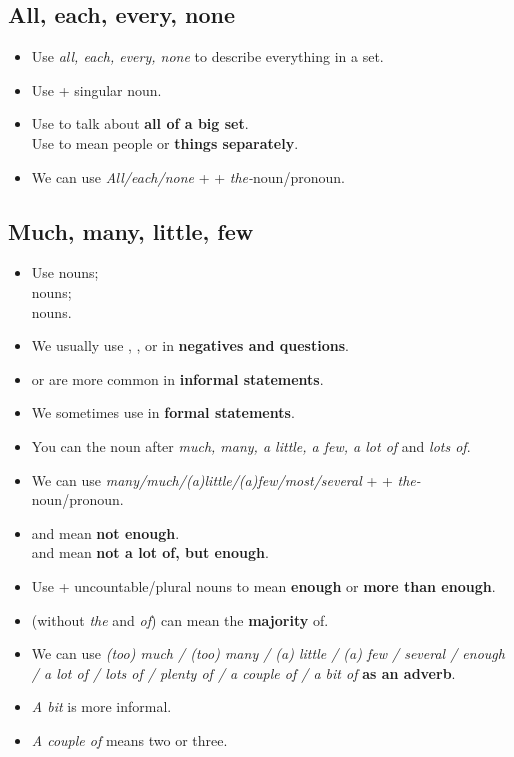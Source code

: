 \subsection{All, each, every, none}
\begin{itemize}
    \item[\doot] Use \textit{all, each, every, none} to describe everything in a set.
    \item[\doot] Use  + singular noun.
    \item[\doot] Use  to talk about \textbf{all of a big set}.\\
    Use  to mean people or \textbf{things separately}.
    \item[\doot] We can use \textit{All/each/none} +  + \textit{the-}noun/pronoun.
\end{itemize}

\subsection{Much, many, little, few}
\begin{itemize}
    \item Use  nouns;\\
     nouns;\\
     nouns.
    \item We usually use , ,  or 
    in \textbf{negatives and questions}.
    \item {} or  are more common in \textbf{informal statements}.
    \item We sometimes use  in \textbf{formal statements}.
    \item You can  the noun after \textit{much, many, a little, a few, a lot of} and \textit{lots of}.
    \item[\doot] We can use \textit{many/much/(a)little/(a)few/most/several} +  + \textit{the-}noun/pronoun.
    \item[\doot]  and  mean \textbf{not enough}.\\
     and  mean \textbf{not a lot of, but enough}.
    \item[\doot] Use  + uncountable/plural nouns to mean \textbf{enough} or \textbf{more than enough}.
    \item[\doot]  (without \textit{the} and \textit{of}) can mean the \textbf{majority} of.
    \item[\doot] We can use \textit{(too) much / (too) many / (a) little / (a) few
    / several / enough / a lot of / lots of / plenty of / a couple of / a bit of} \textbf{as an adverb}.
    \item[\aast] \textit{A bit} is more informal.
    \item[\aast] \textit{A couple of} means two or three.
\end{itemize}

